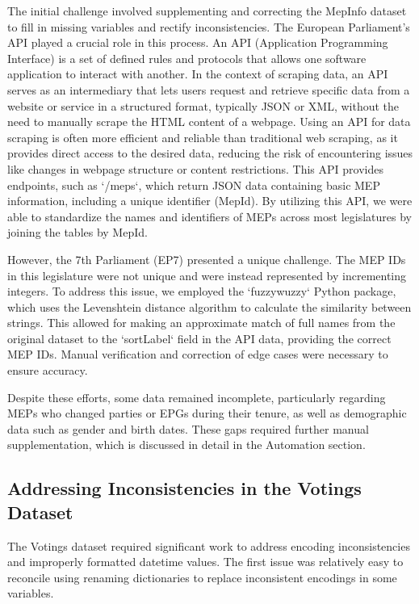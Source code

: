\documentclass{article}
\begin{document}
    The initial challenge involved supplementing and correcting the MepInfo dataset to fill in missing variables and
    rectify inconsistencies. The European Parliament's API played a crucial role in this process. An API (Application
    Programming Interface) is a set of defined rules and protocols that allows one software application to interact with
    another. In the context of scraping data, an API serves as an intermediary that lets users request and retrieve
    specific data from a website or service in a structured format, typically JSON or XML, without the need to manually
    scrape the HTML content of a webpage.
    Using an API for data scraping is often more efficient and reliable than traditional web scraping, as it provides
    direct access to the desired data, reducing the risk of encountering issues like changes in webpage structure or
    content restrictions. This API provides endpoints, such as `/meps`, which return JSON data containing basic MEP
    information, including a unique identifier (MepId). By utilizing this API, we were able to standardize the names and
    identifiers of MEPs across most legislatures by joining the tables by MepId.

    However, the 7th Parliament (EP7) presented a unique challenge. The MEP IDs in this legislature were not unique and
    were instead represented by incrementing integers. To address this issue, we employed the `fuzzywuzzy` Python
    package, which uses the Levenshtein distance algorithm to calculate the similarity between strings. This allowed for
    making an approximate match of full names from the original dataset to the `sortLabel` field in the API data,
    providing the correct MEP IDs. Manual verification and correction of edge cases were necessary to ensure accuracy.

    Despite these efforts, some data remained incomplete, particularly regarding MEPs who changed parties or EPGs during
    their tenure, as well as demographic data such as gender and birth dates. These gaps required further manual
    supplementation, which is discussed in detail in the Automation section.

    \subsection{Addressing Inconsistencies in the Votings Dataset}

    The Votings dataset required significant work to address encoding inconsistencies and improperly formatted datetime
    values. The first issue was relatively easy to reconcile using renaming dictionaries to replace inconsistent
    encodings in some variables.
\end{document}
